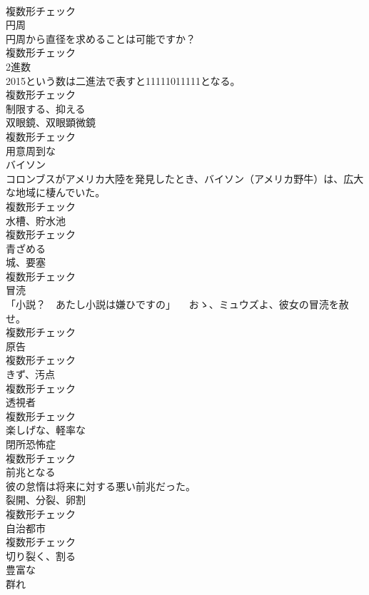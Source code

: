 \documentclass[8pt]{extreport}
\begin{document}
\begin{CJK}{UTF8}{min}
\\	複数形チェック
\\	[名詞]	円周	
\\	円周から直径を求めることは可能ですか？	
\\	複数形チェック
\\	[名詞]	2進数	
\\	2015という数は二進法で表すと11111011111となる。	
\\	複数形チェック
\\	[動詞]	制限する、抑える	
\\	[名詞]	双眼鏡、双眼顕微鏡	
\\	複数形チェック
\\	[形容詞]	用意周到な	
\\	[名詞]	バイソン	
\\	コロンブスがアメリカ大陸を発見したとき、バイソン（アメリカ野牛）は、広大な地域に棲んでいた。	
\\	複数形チェック
\\	[名詞]	水槽、貯水池	
\\	複数形チェック
\\	[動詞]	⻘ざめる	
\\	[名詞]	城、要塞	
\\	複数形チェック
\\	[名詞]	冒涜	
\\	「小説？　あたし小説は嫌ひですの」 　おゝ、ミュウズよ、彼女の冒涜を赦せ。	
\\	複数形チェック
\\	[名詞]	原告	
\\	複数形チェック
\\	[名詞]	きず、汚点	
\\	複数形チェック
\\	[名詞]	透視者	
\\	複数形チェック
\\	[形容詞]	楽しげな、軽率な	
\\	[名詞]	閉所恐怖症	
\\	複数形チェック
\\	[動詞]	前兆となる	
\\	彼の怠惰は将来に対する悪い前兆だった。	
\\	[名詞]	裂開、分裂、卵割	
\\	複数形チェック
\\	[名詞]	自治都市	
\\	複数形チェック
\\	[動詞]	切り裂く、割る	
\\	[形容詞]	豊富な	
\\	[名詞]	群れ	

\end{CJK}
\end{document}
